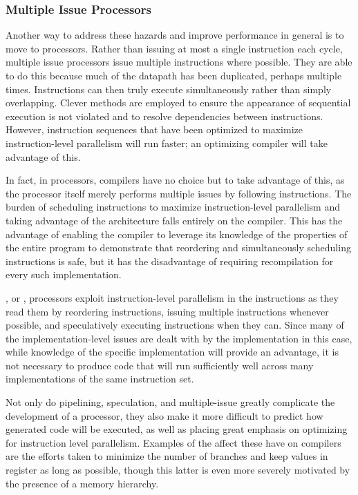 \subsubsection{Multiple Issue Processors}
Another way to address these hazards and improve performance in general is to move to  processors. Rather than issuing at most a single instruction each cycle, multiple issue processors issue multiple instructions where possible. They are able to do this because much of the datapath has been duplicated, perhaps multiple times. Instructions can then truly execute simultaneously rather than simply overlapping. Clever methods are employed to ensure the appearance of sequential execution is not violated and to resolve dependencies between instructions. However, instruction sequences that have been optimized to maximize instruction-level parallelism will run faster; an optimizing compiler will take advantage of this.

In fact, in  processors, compilers have no choice but to take advantage of this, as the processor itself merely performs multiple issues by following instructions. The burden of scheduling instructions to maximize instruction-level parallelism and taking advantage of the architecture falls entirely on the compiler. This has the advantage of enabling the compiler to leverage its knowledge of the properties of the entire program to demonstrate that reordering and simultaneously scheduling instructions is safe, but it has the disadvantage of requiring recompilation for every such implementation. %

, or , processors exploit instruction-level parallelism in the instructions as they read them by reordering instructions, issuing multiple instructions whenever possible, and speculatively executing instructions when they can. Since many of the implementation-level issues are dealt with by the implementation in this case, while knowledge of the specific implementation will provide an advantage, it is not necessary to produce code that will run sufficiently well across many implementations of the same instruction set. %

Not only do pipelining, speculation, and multiple-issue greatly complicate the development of a processor, they also make it more difficult to predict how generated code will be executed, as well as placing great emphasis on optimizing for instruction level parallelism. Examples of the affect these have on compilers are the efforts taken to minimize the number of branches and keep values in register as long as possible, though this latter is even more severely motivated by the presence of a memory hierarchy.

